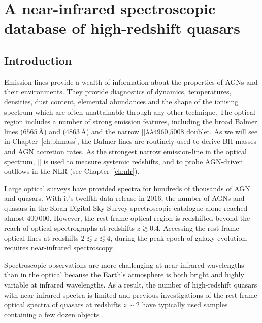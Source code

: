 
\chapter{A near-infrared spectroscopic database of high-redshift quasars}
\label{ch:nirsample}

\section{Introduction}

Emission-lines provide a wealth of information about the properties of AGNs and their environments. 
They provide diagnostics of dynamics, temperatures, densities, dust content, elemental abundances and the shape of the ionising spectrum which are often unattainable through any other technique. 
The optical region includes a number of strong emission features, including the broad Balmer lines \ha ($6565$\,\AA) and \hb ($4863$\,\AA) and the narrow []$\lambda\lambda$$4960$,$5008$ doublet.
As we will see in Chapter~\ref{ch:bhmass}, the Balmer lines are routinely used to derive BH masses and AGN accretion rates. 
As the strongest narrow emission-line in the optical spectrum, [] is used to measure systemic redshifts, and to probe AGN-driven outflows in the NLR (see Chapter~\ref{ch:nlr}). 

Large optical surveys have provided spectra for hundreds of thousands of AGN and quasars. 
With it's twelfth data release in $2016$, the number of AGNs and quasars in the Sloan Digital Sky Survey \citep[SDSS;][]{york00} spectroscopic catalogue alone reached almost $400\,000$. 
However, the rest-frame optical region is redshifted beyond the reach of optical spectrographs at redshifts $z \gtrsim0.4$. 
Accessing the rest-frame optical lines at redshifts $2 \lesssim z \lesssim 4$, during the peak epoch of galaxy evolution, requires near-infrared spectroscopy.  

Spectroscopic observations are more challenging at near-infrared wavelengths than in the optical because the Earth's atmosphere is both bright and highly variable at infrared wavelengths. 
As a result, the number of high-redshift quasars with near-infrared spectra is limited and previous investigations of the rest-frame optical spectra of quasars at redshifts $z\sim2$ have typically used samples containing a few dozen objects \citep[e.g.][]{marziani09,shen12,shen16a}. 

